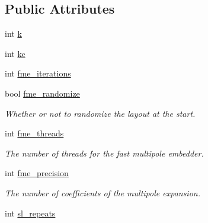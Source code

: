 \subsection*{Public Attributes}
\begin{DoxyCompactItemize}
\item 
int \hyperlink{structtmap_1_1LayoutConfiguration_a80ddc818732d708764fbd83ad7b7d153}{k}
\item 
int \hyperlink{structtmap_1_1LayoutConfiguration_ae63c0a1d5956cbdb837f3aff1978f867}{kc}
\item 
int \hyperlink{structtmap_1_1LayoutConfiguration_aa0b26a532aedb8f0fe4490c9c90b0e84}{fme\+\_\+iterations}
\item 
\mbox{\label{structtmap_1_1LayoutConfiguration_a821bf612fb3063344ca0c6b161424a7b}} 
bool \hyperlink{structtmap_1_1LayoutConfiguration_a821bf612fb3063344ca0c6b161424a7b}{fme\+\_\+randomize}
\begin{DoxyCompactList}\small\item\em Whether or not to randomize the layout at the start. \end{DoxyCompactList}\item 
\mbox{\label{structtmap_1_1LayoutConfiguration_a7630a7d7513c3f51ea00802a3f67ba92}} 
int \hyperlink{structtmap_1_1LayoutConfiguration_a7630a7d7513c3f51ea00802a3f67ba92}{fme\+\_\+threads}
\begin{DoxyCompactList}\small\item\em The number of threads for the fast multipole embedder. \end{DoxyCompactList}\item 
\mbox{\label{structtmap_1_1LayoutConfiguration_a9e4d43d8f65c21404cc9912c11a3eba7}} 
int \hyperlink{structtmap_1_1LayoutConfiguration_a9e4d43d8f65c21404cc9912c11a3eba7}{fme\+\_\+precision}
\begin{DoxyCompactList}\small\item\em The number of coefficients of the multipole expansion. \end{DoxyCompactList}\item 
\mbox{\label{structtmap_1_1LayoutConfiguration_adf81cfbcba521fd87a73dd25eb9c21e7}} 
int \hyperlink{structtmap_1_1LayoutConfiguration_adf81cfbcba521fd87a73dd25eb9c21e7}{sl\+\_\+repeats}

\end{DoxyCompactItemize}
